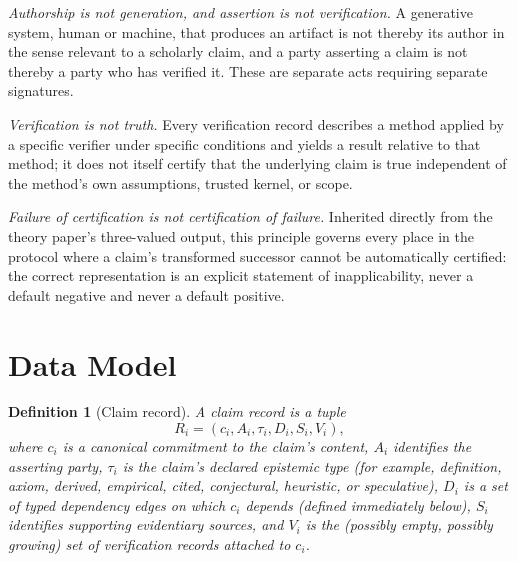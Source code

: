 \documentclass[11pt]{article}
\newtheorem{definition}{Definition}
\begin{document}
\emph{Authorship is not generation, and assertion is not verification.} A generative system, human or machine, that produces an artifact is not thereby its author in the sense relevant to a scholarly claim, and a party asserting a claim is not thereby a party who has verified it. These are separate acts requiring separate signatures.

\emph{Verification is not truth.} Every verification record describes a method applied by a specific verifier under specific conditions and yields a result relative to that method; it does not itself certify that the underlying claim is true independent of the method's own assumptions, trusted kernel, or scope.

\emph{Failure of certification is not certification of failure.} Inherited directly from the theory paper's three-valued output, this principle governs every place in the protocol where a claim's transformed successor cannot be automatically certified: the correct representation is an explicit statement of inapplicability, never a default negative and never a default positive.

\section{Data Model}

\begin{definition}[Claim record]
A claim record is a tuple
\[
R_i = (c_i, A_i, \tau_i, D_i, S_i, V_i),
\]
where $c_i$ is a canonical commitment to the claim's content, $A_i$ identifies the asserting party, $\tau_i$ is the claim's declared epistemic type (for example, definition, axiom, derived, empirical, cited, conjectural, heuristic, or speculative), $D_i$ is a set of typed dependency edges on which $c_i$ depends (defined immediately below), $S_i$ identifies supporting evidentiary sources, and $V_i$ is the (possibly empty, possibly growing) set of verification records attached to $c_i$.
\end{definition}
\end{document}
